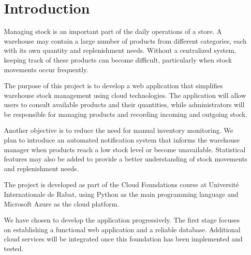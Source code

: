 \section{Introduction}

Managing stock is an important part of the daily
operations of a store. A warehouse may contain a large
number of products from different categories, each with
its own quantity and replenishment needs. Without a
centralized system, keeping track of these products
can become difficult, particularly when stock movements
occur frequently.

The purpose of this project is to develop a web
application that simplifies warehouse stock management
using cloud technologies. The application will allow
users to consult available products and their quantities,
while administrators will be responsible for managing
products and recording incoming and outgoing stock.

Another objective is to reduce the need for manual
inventory monitoring. We plan to introduce an automated
notification system that informs the warehouse manager
when products reach a low stock level or become
unavailable. Statistical features may also be added
to provide a better understanding of stock movements
and replenishment needs.

The project is developed as part of the Cloud Foundations
course at Universit\'e Internationale de Rabat, using
Python as the main programming language and Microsoft
Azure as the cloud platform.

We have chosen to develop the application progressively.
The first stage focuses on establishing a functional
web application and a reliable database. Additional
cloud services will be integrated once this foundation
has been implemented and tested.